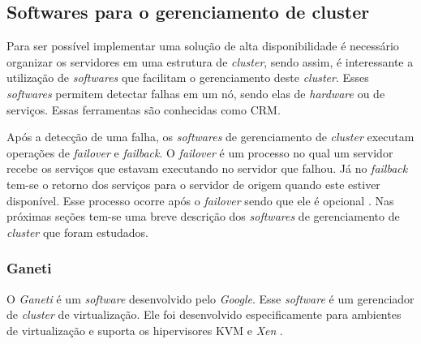 \subsection{Softwares para o gerenciamento de cluster}
\label{section:toolcluster}

Para ser possível implementar uma solução de alta disponibilidade é necessário organizar os servidores em uma estrutura de \textit{cluster},
sendo assim, é interessante a utilização de \textit{softwares} que facilitam o gerenciamento deste \textit{cluster}. Esses \textit{softwares} 
permitem detectar falhas em um nó, sendo elas de \textit{hardware} ou de serviços. Essas ferramentas são conhecidas como \ac{CRM}. 

Após a detecção de uma falha, os \textit{softwares} de gerenciamento de \textit{cluster} executam operações de \textit{failover} e 
\textit{failback}. O \textit{failover} é um processo no qual um servidor recebe os serviços que estavam executando no servidor que falhou. 
Já no \textit{failback} tem-se o retorno dos serviços para o servidor de origem quando este estiver disponível. Esse processo ocorre após o 
\textit{failover} sendo que ele é opcional \cite{bassan2008}. Nas próximas seções tem-se uma breve descrição dos \textit{softwares} de 
gerenciamento de \textit{cluster} que foram estudados.


\subsubsection{Ganeti}
\label{section:ganeti}
O \textit{Ganeti} \cite{ganeti} é um \textit{software} desenvolvido pelo \textit{Google}. Esse \textit{software} é um gerenciador de 
\textit{cluster} de virtualização. Ele foi desenvolvido especificamente para ambientes de virtualização e suporta os hipervisores 
\ac{KVM} \cite{kvm} e \textit{Xen} \cite{xen}. 

